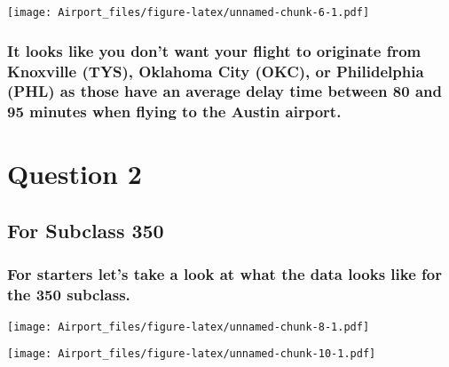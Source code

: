 \documentclass[]{article}
\begin{document}
\texttt{[image: Airport\_files/figure-latex/unnamed-chunk-6-1.pdf]}

\hypertarget{it-looks-like-you-dont-want-your-flight-to-originate-from-knoxville-tys-oklahoma-city-okc-or-philidelphia-phl-as-those-have-an-average-delay-time-between-80-and-95-minutes-when-flying-to-the-austin-airport.}{%
\subsubsection{It looks like you don't want your flight to originate
from Knoxville (TYS), Oklahoma City (OKC), or Philidelphia (PHL) as
those have an average delay time between 80 and 95 minutes when flying
to the Austin
airport.}\label{it-looks-like-you-dont-want-your-flight-to-originate-from-knoxville-tys-oklahoma-city-okc-or-philidelphia-phl-as-those-have-an-average-delay-time-between-80-and-95-minutes-when-flying-to-the-austin-airport.}}

\hypertarget{question-2}{%
\section{Question 2}\label{question-2}}

\hypertarget{for-subclass-350}{%
\subsection{For Subclass 350}\label{for-subclass-350}}

\hypertarget{for-starters-lets-take-a-look-at-what-the-data-looks-like-for-the-350-subclass.}{%
\subsubsection{For starters let's take a look at what the data looks
like for the 350
subclass.}\label{for-starters-lets-take-a-look-at-what-the-data-looks-like-for-the-350-subclass.}}

\texttt{[image: Airport\_files/figure-latex/unnamed-chunk-8-1.pdf]}

\texttt{[image: Airport\_files/figure-latex/unnamed-chunk-10-1.pdf]}
\end{document}
